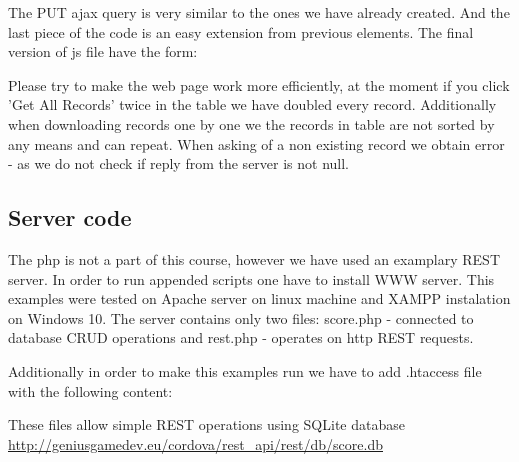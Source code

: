 The PUT ajax query is very similar to the ones we have already created. And the last piece of the code is an easy extension from previous elements. The final version of js file have the form:




\begin{extercises}
  Please try to make the web page work more efficiently, at the moment if you click 'Get All Records' twice in the table we have doubled every record. Additionally when downloading records one by one we the records in table are not sorted by any means and can repeat.  When asking of a non existing record we obtain error -  as we do not check if reply from the server is not null.
\end{extercises}
 
 \subsection{Server code}
 The php is not a part of this course, however we have used an examplary REST server. In order to run appended scripts one have to install WWW server. This examples were tested on Apache server on linux machine and XAMPP instalation on Windows 10. The server contains only two files: score.php - connected to database CRUD operations and rest.php - operates on http REST requests.
 
 
 
 Additionally in order to make this examples run we have to add .htaccess file with the following content:
 
 
 These files allow simple REST operations using SQLite database \url{http://geniusgamedev.eu/cordova/rest_api/rest/db/score.db}
 
 
 